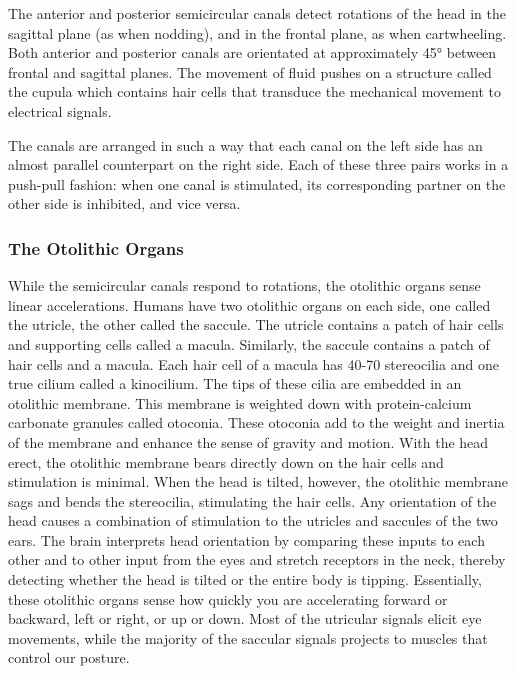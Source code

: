 The anterior and posterior semicircular canals detect rotations of the
head in the sagittal plane (as when nodding), and in the frontal plane,
as when cartwheeling. Both anterior and posterior canals are orientated
at approximately 45° between frontal and sagittal planes. The movement
of fluid pushes on a structure called the cupula which contains hair
cells that transduce the mechanical movement to electrical signals.

The canals are arranged in such a way that each canal on the left side
has an almost parallel counterpart on the right side. Each of these
three pairs works in a push-pull fashion: when one canal is stimulated,
its corresponding partner on the other side is inhibited, and vice
versa.

\hypertarget{the-otolithic-organs}{%
\subsubsection{The Otolithic Organs}\label{the-otolithic-organs}}

While the semicircular canals respond to rotations, the otolithic organs
sense linear accelerations. Humans have two otolithic organs on each
side, one called the utricle, the other called the saccule. The utricle
contains a patch of hair cells and supporting cells called a macula.
Similarly, the saccule contains a patch of hair cells and a macula. Each
hair cell of a macula has 40-70 stereocilia and one true cilium called a
kinocilium. The tips of these cilia are embedded in an otolithic
membrane. This membrane is weighted down with protein-calcium carbonate
granules called otoconia. These otoconia add to the weight and inertia
of the membrane and enhance the sense of gravity and motion. With the
head erect, the otolithic membrane bears directly down on the hair cells
and stimulation is minimal. When the head is tilted, however, the
otolithic membrane sags and bends the stereocilia, stimulating the hair
cells. Any orientation of the head causes a combination of stimulation
to the utricles and saccules of the two ears. The brain interprets head
orientation by comparing these inputs to each other and to other input
from the eyes and stretch receptors in the neck, thereby detecting
whether the head is tilted or the entire body is tipping. Essentially,
these otolithic organs sense how quickly you are accelerating forward or
backward, left or right, or up or down. Most of the utricular signals
elicit eye movements, while the majority of the saccular signals
projects to muscles that control our posture.


